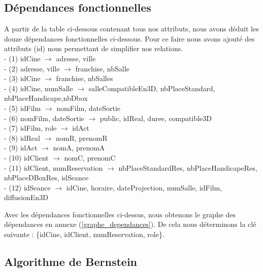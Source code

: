 \documentclass[a4paper,sffamily,12pt]{article}
\begin{document}
			\vspace{0.5cm}						
	
		\subsection{Dépendances fonctionnelles}
		
			\vspace{0.5cm}
		
			A partir de la table ci-dessous contenant tous nos attributs, nous avons déduit les douze dépendances fonctionnelles ci-dessous. Pour ce faire nous avons ajouté des attributs (id) nous permettant de simplifier nos relations.\\
		
			\noindent- (1) idCine $\rightarrow$ adresse, ville \\
			- (2) adresse, ville $\rightarrow$ franchise, nbSalle \\
			- (3) idCine $\rightarrow$ franchise, nbSalles \\
			- (4) idCine, numSalle $\rightarrow$ salleCompatibleEn3D, nbPlaceStandard, nbPlaceHandicape,nbDbox \\
	 		- (5) idFilm $\rightarrow$ nomFilm, dateSortie \\
			- (6) nomFilm, dateSortie $\rightarrow$ public, idReal, duree, compatible3D \\
			- (7) idFilm, role $\rightarrow$  idAct \\
			- (8) idReal $\rightarrow$ nomR, prenomR \\
			- (9) idAct $\rightarrow$ nomA, prenomA \\
			- (10) idClient $\rightarrow$ nomC, prenomC \\
			- (11) idClient, numReservation $\rightarrow$ nbPlaceStandardRes, nbPlaceHandicapeRes, nbPlaceDBoxRes, idSeance \\
			- (12) idSeance $\rightarrow$ idCine, horaire, dateProjection, numSalle, idFilm, diffusionEn3D \\
			
			\newpage
			
			Avec les dépendances fonctionnelles ci-dessus, nous obtenons le graphe des dépendances en annexe (\ref{graphe_dependances}). De cela nous déterminons la clé suivante : \{idCine, idClient, numReservation, role\}.
			
		\subsection{Algorithme de Bernstein}
		
\end{document}
